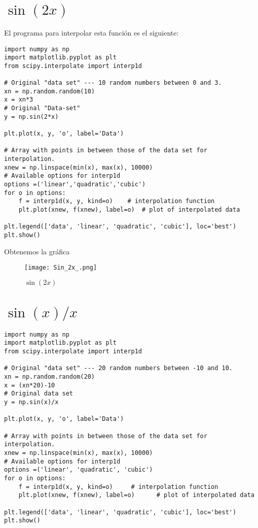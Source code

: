 \documentclass[a4 paper]{article}
\numberwithin{equation}{section}
\newcommand{\0}{\mathbf{0}}
\begin{document}
\section{$\sin(2x)$}

El programa para interpolar esta funci\'on es el siguiente:

\begin{verbatim}
import numpy as np
import matplotlib.pyplot as plt
from scipy.interpolate import interp1d

# Original "data set" --- 10 random numbers between 0 and 3.
xn = np.random.random(10)
x = xn*3
# Original "Data-set"
y = np.sin(2*x)

plt.plot(x, y, 'o', label='Data')

# Array with points in between those of the data set for interpolation.
xnew = np.linspace(min(x), max(x), 10000)
# Available options for interp1d
options =('linear','quadratic','cubic')
for o in options:
    f = interp1d(x, y, kind=o)    # interpolation function
    plt.plot(xnew, f(xnew), label=o)  # plot of interpolated data
    
plt.legend(['data', 'linear', 'quadratic', 'cubic'], loc='best')
plt.show()
\end{verbatim}

Obtenemos la gr\'afica 

\vspace{0.5cm}

\begin{figure}[!ht]
  \centering
      \texttt{[image: Sin\_2x\_.png]}
  \caption{$\sin(2x)$}
\end{figure}

\vspace{0.5cm}

\section{$\sin(x)/x$}

\begin{verbatim}
import numpy as np
import matplotlib.pyplot as plt
from scipy.interpolate import interp1d

# Original "data set" --- 20 random numbers between -10 and 10.
xn = np.random.random(20)
x = (xn*20)-10
# Original data set
y = np.sin(x)/x

plt.plot(x, y, 'o', label='Data')

# Array with points in between those of the data set for interpolation.
xnew = np.linspace(min(x), max(x), 10000)
# Available options for interp1d
options =('linear', 'quadratic', 'cubic')
for o in options:
    f = interp1d(x, y, kind=o)     # interpolation function
    plt.plot(xnew, f(xnew), label=o)      # plot of interpolated data
  
plt.legend(['data', 'linear', 'quadratic', 'cubic'], loc='best')
plt.show()
\end{verbatim}
\newpage
\end{document}
